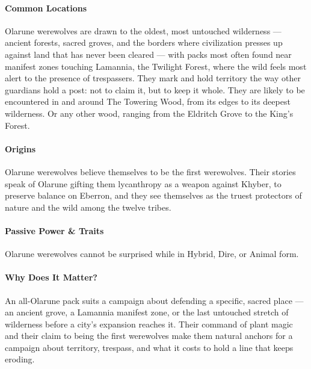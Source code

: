 \documentclass[twocolumn]{dndbook}
\begin{document}
\paragraph*{Common Locations} Olarune werewolves are drawn to the oldest, most untouched wilderness --- ancient forests, sacred groves, and the borders where civilization presses up against land that has never been cleared --- with packs most often found near manifest zones touching Lamannia, the Twilight Forest, where the wild feels most alert to the presence of trespassers.
They mark and hold territory the way other guardians hold a post: not to claim it, but to keep it whole.
They are likely to be encountered in and around The Towering Wood, from its edges to its deepest wilderness.
Or any other wood, ranging from the Eldritch Grove to the King's Forest.\par

\paragraph*{Origins} Olarune werewolves believe themselves to be the first werewolves.
Their stories speak of Olarune gifting them lycanthropy as a weapon against Khyber, to preserve balance on Eberron, and they see themselves as the truest protectors of nature and the wild among the twelve tribes.

\paragraph*{Passive Power \& Traits} Olarune werewolves cannot be surprised while in Hybrid, Dire, or Animal form.

\paragraph*{Why Does It Matter?} An all-Olarune pack suits a campaign about defending a specific, sacred place --- an ancient grove, a Lamannia manifest zone, or the last untouched stretch of wilderness before a city's expansion reaches it.
Their command of plant magic and their claim to being the first werewolves make them natural anchors for a campaign about territory, trespass, and what it costs to hold a line that keeps eroding.
\end{document}
